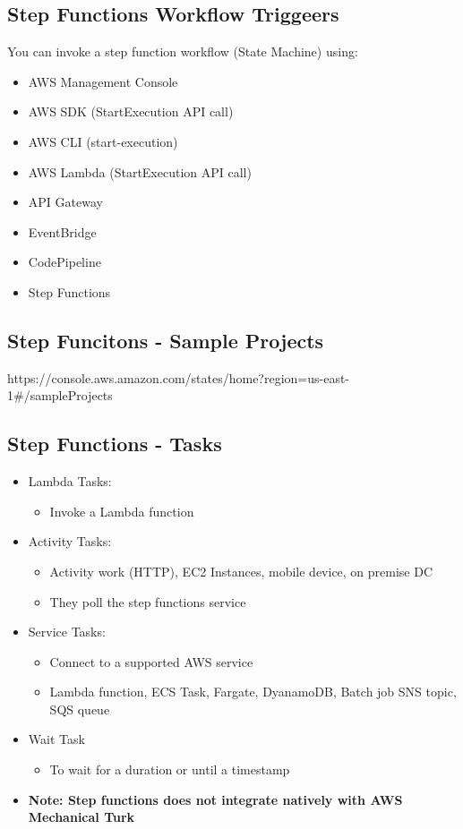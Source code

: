 \subsection{Step Functions Workflow Triggeers}
You can invoke a step function workflow (State Machine) using:
\begin{itemize}
    \item AWS Management Console
    \item AWS SDK (StartExecution API call)
    \item AWS CLI (start-execution)
    \item AWS Lambda (StartExecution API call)
    \item API Gateway
    \item EventBridge
    \item CodePipeline
    \item Step Functions
\end{itemize}

\subsection{Step Funcitons - Sample Projects}
https://console.aws.amazon.com/states/home?region=us-east-
1#/sampleProjects

\subsection{Step Functions - Tasks}
\begin{itemize}
    \item Lambda Tasks:
    \begin{itemize}
        \item Invoke a Lambda function
    \end{itemize}
    \item Activity Tasks:
    \begin{itemize}
        \item Activity work (HTTP), EC2 Instances, mobile device, on premise DC
        \item They poll the step functions service
    \end{itemize}
    \item Service Tasks:
    \begin{itemize}
        \item Connect to a supported AWS service
        \item Lambda function, ECS Task, Fargate, DyanamoDB, Batch job SNS topic, SQS queue
    \end{itemize}
    \item Wait Task
    \begin{itemize}
        \item To wait for a duration or until a timestamp
    \end{itemize}
    \item \textbf{Note: Step functions does not integrate natively with AWS Mechanical Turk}
\end{itemize}

